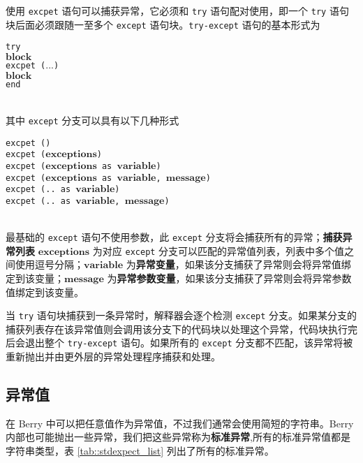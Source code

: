 使用 \texttt{excpet} 语句可以捕获异常，它必须和 \texttt{try} 语句配对使用，即一个 \texttt{try} 语句块后面必须跟随一至多个 \texttt{except} 语句块。\texttt{try-except} 语句的基本形式为
\begin{algorithm}
    \texttt{try} \\
        \qquad $\bm{block}$ \\
    \texttt{excpet (}$\bm{...}$\texttt{)} \\
        \qquad $\bm{block}$ \\
    \texttt{end}
\end{algorithm}\vspace{-0.6em}\\
其中 \texttt{except} 分支可以具有以下几种形式
\begin{algorithm}
    \texttt{excpet ()} \\
    \texttt{excpet (}$\bm{exceptions}$\texttt{)} \\
    \texttt{excpet (}$\bm{exceptions}$\texttt{ as }$\bm{variable}$\texttt{)} \\
    \texttt{excpet (}$\bm{exceptions}$\texttt{ as }$\bm{variable}$\texttt{, }$\bm{message}$\texttt{)} \\ 
    \texttt{excpet (.. as }$\bm{variable}$\texttt{)} \\
    \texttt{excpet (.. as }$\bm{variable}$\texttt{, }$\bm{message}$\texttt{)} \\
\end{algorithm}\vspace{-0.6em}\\
最基础的 \texttt{except} 语句不使用参数，此 \texttt{except} 分支将会捕获所有的异常；\textbf{捕获异常列表} $\bm{exceptions}$ 为对应 \texttt{except} 分支可以匹配的异常值列表，列表中多个值之间使用逗号分隔；$\bm{variable}$ 为\textbf{异常变量}，如果该分支捕获了异常则会将异常值绑定到该变量；$\bm{message}$ 为\textbf{异常参数变量}，如果该分支捕获了异常则会将异常参数值绑定到该变量。

当 \texttt{try} 语句块捕获到一条异常时，解释器会逐个检测 \texttt{except} 分支。如果某分支的捕获列表存在该异常值则会调用该分支下的代码块以处理这个异常，代码块执行完后会退出整个 \texttt{try-except} 语句。如果所有的 \texttt{except} 分支都不匹配，该异常将被重新抛出并由更外层的异常处理程序捕获和处理。

\subsection{异常值}

在 Berry 中可以把任意值作为异常值，不过我们通常会使用简短的字符串。Berry 内部也可能抛出一些异常，我们把这些异常称为\textbf{标准异常},所有的标准异常值都是字符串类型，表 \ref{tab::stdexpect_list} 列出了所有的标准异常。

